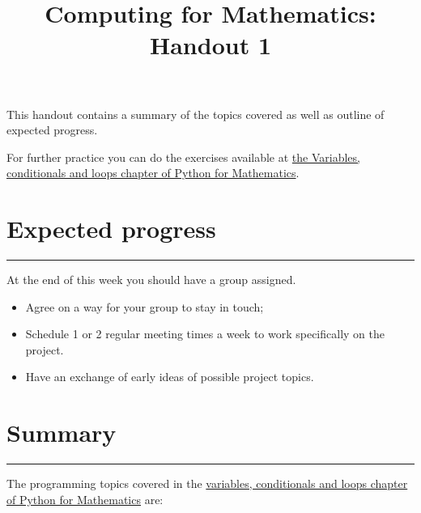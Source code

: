 \documentclass{article}
\title{Computing for Mathematics: Handout 1}
\date{}
\begin{document}
\maketitle


This handout contains a summary of the topics covered as well as outline of
expected progress.

For further practice you can do the exercises available at 
\href{https://vknight.org/pfm/building-tools/01-variables-conditionals-loops/exercises/main.html}{the
Variables, conditionals and loops chapter of Python for Mathematics}.

\section{Expected progress}
\hrule

At the end of this week you should have a group assigned.

\begin{itemize}
    \item Agree on a way for your group to stay in touch;
    \item Schedule 1 or 2 regular meeting times a week to work specifically on
        the project.
    \item Have an exchange of early ideas of possible project topics.
\end{itemize}

\begin{center}
\end{center}

\section{Summary}\label{summary}
\hrule

The programming topics covered in the
\href{https://vknight.org/pfm/building-tools/01-variables-conditionals-loops/introduction/main.html}{variables,
conditionals and loops chapter of Python for Mathematics} are:
\end{document}

